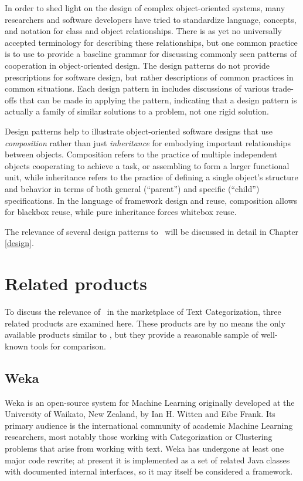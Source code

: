 In order to shed light on the design of complex object-oriented
systems, many researchers and software developers have tried to
standardize language, concepts, and notation for class and object
relationships.  There is as yet no universally accepted terminology
for describing these relationships, but one common practice is to use
 to provide a baseline grammar for
discussing commonly seen patterns of cooperation in object-oriented
design. \cite[p. 3]{gamma:95} The design patterns do not provide
prescriptions for software design, but rather descriptions of common
practices in common situations.  Each design pattern in \cite{gamma:95}
includes discussions of various trade-offs that can be made in applying
the pattern, indicating that a design pattern is actually a family of
similar solutions to a problem, not one rigid solution.

Design patterns help to illustrate object-oriented software designs
that use \emph{composition} rather than just \emph{inheritance} for
embodying important relationships between objects.  Composition refers
to the practice of multiple independent objects cooperating to achieve
a task, or assembling to form a larger functional unit, while
inheritance refers to the practice of defining a single object's
structure and behavior in terms of both general (``parent'') and
specific (``child'') specifications.  In the language of framework
design and reuse, composition allows for blackbox reuse, while pure
inheritance forces whitebox reuse. \cite[p. 19]{gamma:95}

The relevance of several design patterns to \aicat\ will be discussed
in detail in Chapter \ref{design}.

\section{Related products}

To discuss the relevance of \aicat\ in the marketplace of Text
Categorization, three related products are examined here.  These
products are by no means the only available products similar to
\aicat, but they provide a reasonable sample of well-known tools for
comparison.

\subsection{Weka}

Weka is an open-source system for Machine Learning originally
developed at the University of Waikato, New Zealand, by Ian H. Witten
and Eibe Frank. \cite{weka:99} Its primary
audience is the international community of academic Machine Learning
researchers, most notably those working with Categorization or
Clustering problems that arise from working with text.  Weka has
undergone at least one major code rewrite; at present it is
implemented as a set of related Java classes with documented internal
interfaces, so it may itself be considered a framework.

